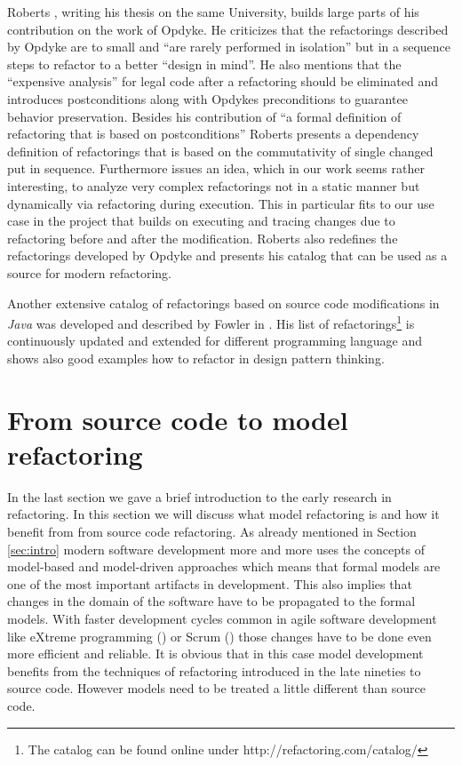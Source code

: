 \documentclass{llncs}
\begin{document}
Roberts \cite{rob99}, writing his thesis on the same University, builds large parts of his contribution on the work of Opdyke. He criticizes that the refactorings described by Opdyke are to small and ``are rarely performed in isolation'' but in a sequence steps to refactor to a better ``design in mind''.  He also mentions that the ``expensive analysis'' for legal code after a refactoring should be eliminated and introduces postconditions along with Opdykes preconditions to guarantee behavior preservation. Besides his contribution of ``a formal definition of refactoring that is based on postconditions'' Roberts presents a dependency definition of refactorings that is based on the commutativity of single changed put in sequence. Furthermore issues an idea, which in our work seems rather interesting, to analyze very complex refactorings not in a static manner but dynamically via refactoring during execution. This in particular fits to our use case in the project that builds on executing and tracing changes due 
to refactoring before and after the modification. Roberts also redefines the refactorings developed by Opdyke and presents his catalog that can be used as a source for modern refactoring. 

Another extensive catalog of refactorings based on source code modifications in \textit{Java} was developed and described by Fowler in \cite{fow99}. His list of refactorings\footnote{The catalog can be found online under http://refactoring.com/catalog/} is continuously updated and extended for different programming language and shows also good examples how to refactor in design pattern thinking.

\section{From source code to model refactoring}
\label{sec:fromto}

In the last section we gave a brief introduction to the early research in refactoring. In this section we will discuss what model refactoring is and how it benefit from from source code refactoring. As already mentioned in Section \ref{sec:intro} modern software development more and more uses the concepts of model-based and model-driven approaches which means that formal models are one of the most important artifacts in development. This also implies that changes in the domain of the software have to be propagated to the formal models. With faster development cycles common in agile software development like eXtreme programming (\cite{DBLP:journals/computer/Beck99}) or Scrum (\cite{DBLP:journals/software/RisingJ00}) those changes have to be done even more efficient and reliable. It is obvious that in this case model development benefits from the techniques of refactoring introduced in the late nineties to source code. However models need to be treated a little different than source code.
\end{document}
